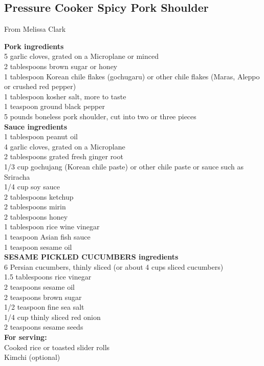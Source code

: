 \documentclass{article}
\numberwithin{figure}{section}
\numberwithin{equation}{section}
\begin{document}
\pagebreak
\subsection{Pressure Cooker Spicy Pork Shoulder}
From Melissa Clark

{\bf Pork ingredients}\\
5  garlic cloves, grated on a Microplane or minced\\
2  tablespoons brown sugar or honey\\
1  tablespoon Korean chile flakes (gochugaru) or other chile flakes (Maras, Aleppo or crushed red pepper)\\
1  tablespoon kosher salt, more to taste\\
1  teaspoon ground black pepper\\
5  pounds boneless pork shoulder, cut into two or three pieces\\

{\bf Sauce ingredients}\\
1  tablespoon peanut oil\\
4  garlic cloves, grated on a Microplane\\
2  tablespoons grated fresh ginger root\\
1/3  cup gochujang (Korean chile paste) or other chile paste or sauce such as Sriracha\\
1/4  cup soy sauce\\
2  tablespoons ketchup\\
2  tablespoons mirin\\
2  tablespoons honey\\
1  tablespoon rice wine vinegar\\
1  teaspoon Asian fish sauce\\
1  teaspoon sesame oil\\

{\bf SESAME PICKLED CUCUMBERS ingredients}\\
6  Persian cucumbers, thinly sliced (or about 4 cups sliced cucumbers)\\
1.5  tablespoons rice vinegar\\
2  teaspoons sesame oil\\
2  teaspoons brown sugar\\
1/2  teaspoon fine sea salt\\
1/4  cup thinly sliced red onion\\
2  teaspoons sesame seeds\\

{\bf For serving:}\\
Cooked rice or toasted slider rolls\\
Kimchi (optional)\\
\end{document}
